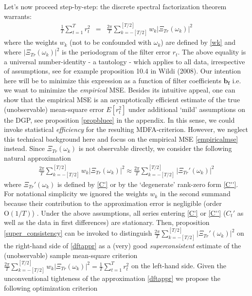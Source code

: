\documentclass[11pt]{article}
\begin{document}
Let's now proceed step-by-step: the  discrete spectral factorization theorem warrants:
\begin{eqnarray}\label{empiricalmse}
\frac{1}{T}\sum_{t=1}^T r_t^2&=&\frac{2\pi}{T}\sum_{k=-[T/2]}^{[T/2]}w_k\left|\Xi_{Tr}(\omega_k)\right|^2
\end{eqnarray}
where the weights $w_k$ (not to be confounded with $\omega_k$) are defined by \ref{wk} and where $\left|\Xi_{Tr}(\omega_k)\right|^2$ is the periodogram of the filter error $r_t$. The above equality is a universal number-identity - a tautology - which applies to all data, irrespective of assumptions, see for example proposition 10.4 in Wildi (2008). Our intention here will be to minimize this expression as a function of filter coefficients $\mathbf{b_f}$ i.e. we want to minimize the \emph{empirical} MSE. Besides its intuitive appeal, one can show that the empirical MSE is an asymptotically {efficient} estimate of the true (unobservable) mean-square error $E[r_t^2]$ under additional `mild' assumptions on the DGP, see proposition \ref{propbluee} in the appendix. In this sense, we could invoke statistical \emph{efficiency} for the resulting MDFA-criterion. However, we neglect this technical background here and focus on the empirical MSE  \ref{empiricalmse} instead. Since $\Xi_{Tr}(\omega_k)$ is not observable directly, we consider the following natural approximation
\begin{eqnarray}\label{dftappr}
\frac{2\pi}{T}\sum_{k=-[T/2]}^{[T/2]}w_k\left|\Xi_{Tr}(\omega_k)\right|^2\approx\frac{2\pi}{T}\sum_{k=-[T/2]}^{[T/2]}\left|\Xi_{Tr}'(\omega_k)\right|^2
\end{eqnarray}
where $\Xi_{Tr}'(\omega_k)$ is defined by \ref{C'} or by the `degenerate' rank-zero form \ref{C''}. 
For notational simplicity we ignored the weights $w_k$ in the second summand because their contribution to the approximation error is negligible (order $\textrm{O}(1/T)$) . 
Under the above assumptions, all series entering  \ref{C'} or  \ref{C''} ($C_t'$ as well as the data in first differences) are stationary.  Then, proposition \ref{super_consistency} can be invoked to distinguish $\frac{2\pi}{T}\sum_{k=-[T/2]}^{[T/2]}\left|\Xi_{Tr}'(\omega_k)\right|^2$ on the right-hand side of \ref{dftappr} as a (very) good \emph{superconsistent} estimate of the (unobservable) sample mean-square criterion $\frac{2\pi}{T}\sum_{k=-[T/2]}^{[T/2]}w_k\left|\Xi_{Tr}(\omega_k)\right|^2=\frac{1}{T}\sum_{t=1}^T r_t^2$ on the left-hand side. Given the unconventional tighteness of the approximation \ref{dftappr}  we propose the following optimization criterion
\end{document}
